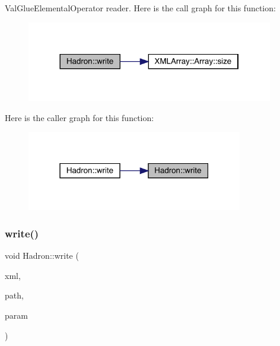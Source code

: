 Val\+Glue\+Elemental\+Operator reader. Here is the call graph for this function\+:\nopagebreak
\begin{figure}[H]
\begin{center}
\leavevmode
\includegraphics[width=305pt]{d1/daf/namespaceHadron_aee7b5924c79af024abb8c3d99f7e8b34_cgraph}
\end{center}
\end{figure}
Here is the caller graph for this function\+:\nopagebreak
\begin{figure}[H]
\begin{center}
\leavevmode
\includegraphics[width=267pt]{d1/daf/namespaceHadron_aee7b5924c79af024abb8c3d99f7e8b34_icgraph}
\end{center}
\end{figure}
\mbox{\label{namespaceHadron_aa7f9575393c93afa7db5f164da5c31eb}} 
\subsubsection{\texorpdfstring{write()}{write()}\hspace{0.1cm}{\footnotesize\ttfamily [66/95]}}
{\footnotesize\ttfamily void Hadron\+::write (\begin{DoxyParamCaption}\item[{\mbox{\hyperlink{classADATXML_1_1XMLWriter}{X\+M\+L\+Writer}} \&}]{xml,  }\item[{const std\+::string \&}]{path,  }\item[{const \mbox{\hyperlink{structHadron_1_1KeyHadronNode__t_1_1Quark__t}{Key\+Hadron\+Node\+\_\+t\+::\+Quark\+\_\+t}} \&}]{param }\end{DoxyParamCaption})}



